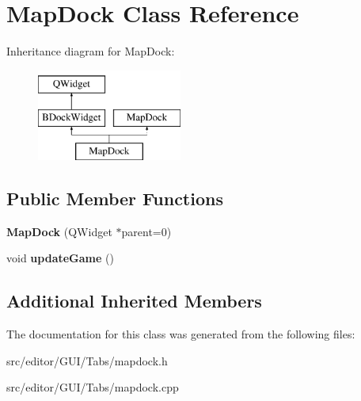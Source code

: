 \hypertarget{class_map_dock}{}\section{Map\+Dock Class Reference}
\label{class_map_dock}
Inheritance diagram for Map\+Dock\+:\begin{figure}[H]
\begin{center}
\leavevmode
\includegraphics[height=3.000000cm]{class_map_dock}
\end{center}
\end{figure}
\subsection*{Public Member Functions}
\begin{DoxyCompactItemize}
\item 
\hypertarget{class_map_dock_ae65c5f2f8531ec69a9289c8d4731226e}{}\label{class_map_dock_ae65c5f2f8531ec69a9289c8d4731226e} 
{\bfseries Map\+Dock} (Q\+Widget $\ast$parent=0)
\item 
\hypertarget{class_map_dock_a4913eb300e5dd170e9b6c16799731db3}{}\label{class_map_dock_a4913eb300e5dd170e9b6c16799731db3} 
void {\bfseries update\+Game} ()
\end{DoxyCompactItemize}
\subsection*{Additional Inherited Members}


The documentation for this class was generated from the following files\+:\begin{DoxyCompactItemize}
\item 
src/editor/\+G\+U\+I/\+Tabs/mapdock.\+h\item 
src/editor/\+G\+U\+I/\+Tabs/mapdock.\+cpp\end{DoxyCompactItemize}
